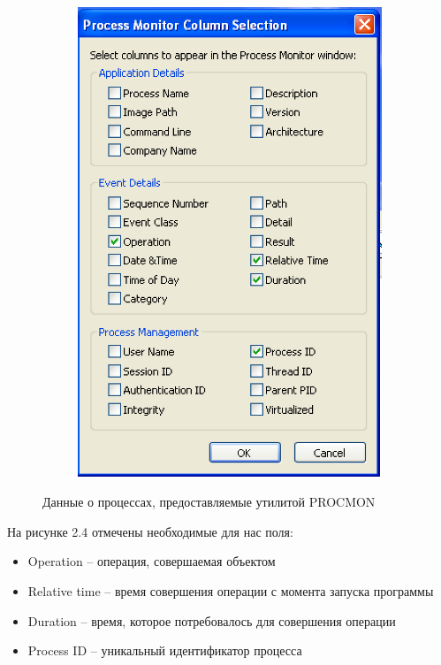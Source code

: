 \begin{figure}[ht]
	\centering
    \begin{subfigure}[b]{1\textwidth}
    \centering
        \includegraphics[scale=0.5]{procmon_columns.png}        
    \end{subfigure}
 
    \caption{Данные о процессах, предоставляемые утилитой PROCMON}
    \label{fig_parsetree}
\end{figure}

На рисунке 2.4 отмечены необходимые для нас поля:
\begin{itemize}
\item Operation -- операция, совершаемая объектом
\item Relative time -- время совершения операции с момента запуска программы
\item Duration -- время, которое потребовалось для совершения операции
\item Process ID -- уникальный идентификатор процесса
\end{itemize}

